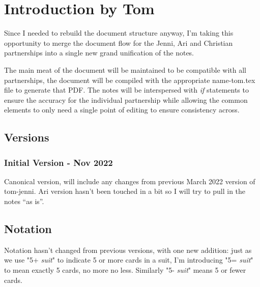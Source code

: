 \documentclass[main]{subfile}
\begin{document}
\chapter{Introduction by Tom}

Since I needed to rebuild the document structure anyway, I'm taking this opportunity to merge the document flow for the Jenni, Ari and Christian partnerships into a single new grand unification of the notes.  

The main meat of the document will be maintained to be compatible with all partnerships, the document will be compiled with the appropriate name-tom.tex file to generate that PDF.  The notes will be interspersed with \textit{if} statements to ensure the accuracy for the individual partnership while allowing the common elements to only need a single point of editing to ensure consistency across.

\section{Versions}

\subsection{Initial Version - Nov 2022}

Canonical version, will include any changes from previous March 2022 version of tom-jenni.  Ari version hasn't been touched in a bit so I will try to pull in the notes ``as is''.

\section{Notation}

Notation hasn't changed from previous versions, with one new addition:  just as we use "5+ \textit{suit}" to indicate 5 or more cards in a suit, I'm introducing "5= \textit{suit}" to mean exactly 5 cards, no more no less.  Similarly "5- \textit{suit}" means 5 or fewer cards.

\end{document}
